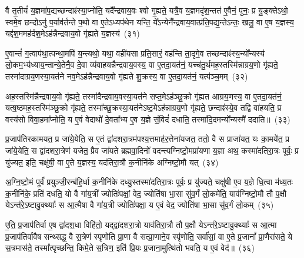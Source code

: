 वै तृ॒तीयं॑ य॒ज्ञमा॑प॒द्यच्छन्दाꣴ॑स्या॒प्नोति॒ यदै᳚न्द्रवाय॒वः श्वो गृ॒ह्यते॒ यत्रै॒व य॒ज्ञमदृ॑श॒न्तत॑ ए॒वैनं॒ पुनः॒ प्र यु॒ङ्क्ते\-ऽथो॒ स्वमे॒व छन्दो\-ऽनु॑ प॒र्याव॑र्तन्ते प॒थो वा ए॒ते\-ऽध्यप॑थेन यन्ति॒ ये᳚\-ऽन्येनै᳚न्द्रवाय॒वात्प्र॑ति॒पद्य॒न्ते\-ऽन्तः॒ खलु॒ वा ए॒ष य॒ज्ञस्य॒ यद्द॑श॒ममह॑र्दश॒मे\-ऽह॑न्नैन्द्रवाय॒वो गृ॑ह्यते य॒ज्ञस्य॑~(३१)\ip

ए॒वान्तं॑ ग॒त्वाप॑था॒त्पन्था॒मपि॑ य॒न्त्यथो॒ यथा॒ वही॑यसा प्रति॒सारं॒ वह॑न्ति ता॒दृगे॒व तच्छन्दाꣴ॑स्य॒न्यो᳚न्यस्य॑ लो॒कम॒भ्य॑ध्याय॒न्तान्ये॒तेनै॒व दे॒वा व्य॑वाहयन्नैन्द्रवाय॒वस्य॒ वा ए॒तदा॒यत॑नं॒ यच्च॑तु॒र्थमह॒स्तस्मि॑न्नाग्रय॒णो गृ॑ह्यते॒ तस्मा॑दाग्रय॒णस्या॒यत॑ने नव॒मे\-ऽह॑न्नैन्द्रवाय॒वो गृ॑ह्यते शु॒क्रस्य॒ वा ए॒तदा॒यत॑नं॒ यत्प॑ञ्च॒मम्~(३२)\ip

अह॒स्तस्मि॑न्नैन्द्रवाय॒वो गृ॑ह्यते॒ तस्मा॑दैन्द्रवाय॒वस्या॒यत॑ने सप्त॒मे\-ऽह॑ञ्छु॒क्रो गृ॑ह्यत आग्रय॒णस्य॒ वा ए॒तदा॒यत॑नं॒ यत्ष॒ष्ठमह॒स्तस्मि॑ञ्छु॒क्रो गृ॑ह्यते॒ तस्मा᳚च्छु॒क्रस्या॒यत॑ने\-ऽष्ट॒मे\-ऽह॑न्नाग्रय॒णो गृ॑ह्यते॒ छन्दाꣴ॑स्ये॒व तद्वि वा॑हयति॒ प्र वस्य॑सो विवा॒हमा᳚प्नोति॒ य ए॒वं वेदाथो॑ दे॒वता᳚भ्य ए॒व य॒ज्ञे सं॒विदं॑ दधाति॒ तस्मा॑दि॒दमन्यो᳚न्यस्मै॑ ददाति॥~(३३)\ip

{\anuvakamend[{ए॒तद्वै प॑ञ्च॒मे\-ऽह॒न्त्रैष्टु॑भ ए॒तद्गृ॑ह्यते य॒ज्ञस्य॑ प़ञ्च॒मम॒न्यस्मा॒ एक॑ञ्च}]}

प्र॒जा\-प॑तिरकामयत॒ प्र जा॑ये॒येति॒ स ए॒तं द्वा॑दशरा॒त्रम॑पश्य॒त्तमाह॑र॒त्तेना॑यजत॒ ततो॒ वै स प्राजा॑यत॒ यः का॒मये॑त॒ प्र जा॑ये॒येति॒ स द्वा॑दशरा॒त्रेण॑ यजेत॒ प्रैव जा॑यते ब्रह्मवा॒दिनो॑ वदन्त्यग्निष्टो॒मप्रा॑यणा य॒ज्ञा अथ॒ कस्मा॑दतिरा॒त्रः पूर्वः॒ प्र यु॑ज्यत॒ इति॒ चक्षु॑षी॒ वा ए॒ते य॒ज्ञस्य॒ यद॑तिरा॒त्रौ क॒नीनि॑के अग्निष्टो॒मौ यत्~(३४)\ip

अ॒ग्नि॒ष्टो॒मं पूर्वं॑ प्रयुञ्जी॒रन्ब॑हि॒र्धा क॒नीनि॑के दध्यु॒स्तस्मा॑दतिरा॒त्रः पूर्वः॒ प्र यु॑ज्यते॒ चक्षु॑षी ए॒व य॒ज्ञे धि॒त्वा म॑ध्य॒तः क॒नीनि॑के॒ प्रति॑ दधति॒ यो वै गा॑य॒त्रीं ज्योतिः॑पक्षां॒ वेद॒ ज्योति॑षा भा॒सा सु॑व॒र्गं लो॒कमे॑ति॒ याव॑ग्निष्टो॒मौ तौ प॒क्षौ ये\-ऽन्त॑रे॒\-ऽष्टावु॒क्थ्याः᳚ स आ॒त्मैषा वै गा॑य॒त्री ज्योतिः॑पक्षा॒ य ए॒वं वेद॒ ज्योति॑षा भा॒सा सु॑व॒र्गं लो॒कम्~(३५)\ip

ए॒ति॒ प्र॒जा\-प॑तिर्वा ए॒ष द्वा॑दश॒धा विहि॑तो॒ यद्द्वा॑दशरा॒त्रो याव॑तिरा॒त्रौ तौ प॒क्षौ ये\-ऽन्त॑रे॒\-ऽष्टावु॒क्थ्याः᳚ स आ॒त्मा प्र॒जा\-प॑तिर्वावैष सन्थ्सद्ध॒ वै स॒त्रेण॑ स्पृणोति प्रा॒णा वै सत्प्रा॒णाने॒व स्पृ॑णोति॒ सर्वा॑सां॒ वा ए॒ते प्र॒जानां᳚ प्रा॒णैरा॑सते॒ ये स॒त्रमास॑ते॒ तस्मा᳚त्पृच्छन्ति॒ किमे॒ते स॒त्रिण॒ इति॑ प्रि॒यः प्र॒जाना॒मुत्थि॑तो भवति॒ य ए॒वं वेद॑॥~(३६)\ip

